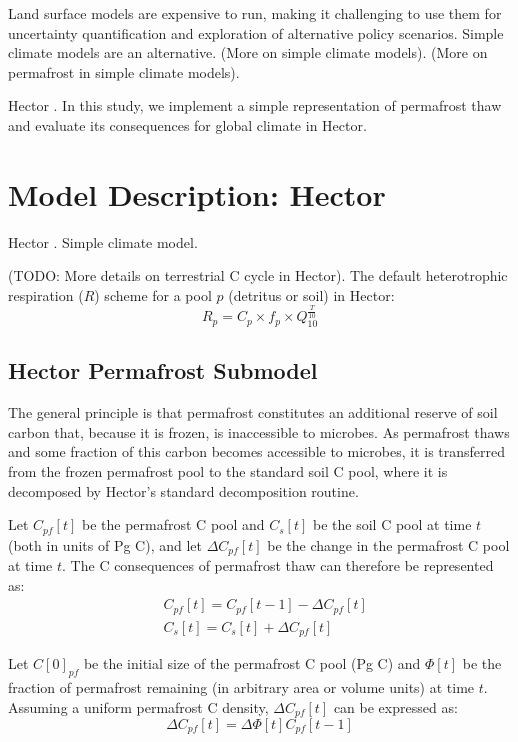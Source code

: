 \documentclass[essd, manuscript]{copernicus}
\begin{document}
Land surface models are expensive to run, making it challenging to use them for uncertainty quantification and exploration of alternative policy scenarios.
Simple climate models are an alternative.
(More on simple climate models).
(More on permafrost in simple climate models).

Hector \citep{hartin_2015_simple, vega-westhoff_2019_impacts}.
In this study, we implement a simple representation of permafrost thaw and evaluate its consequences for global climate in Hector.


\section{Model Description: Hector}
Hector \citep{hartin_2015_simple, hartin_2016_ocean}.
Simple climate model.

(TODO: More details on terrestrial C cycle in Hector).
The default heterotrophic respiration ($R$) scheme for a pool $p$ (detritus or soil) in Hector: 
\begin{equation}
R_{p} = C_p \times f_p \times Q_{10} ^ \frac{T}{10}    
\end{equation} 


\subsection{Hector Permafrost Submodel}
The general principle is that permafrost constitutes an additional reserve of soil carbon that, because it is frozen, is inaccessible to microbes. As permafrost thaws and some fraction of this carbon becomes accessible to microbes, it is transferred from the frozen permafrost pool to the standard soil C pool, where it is decomposed by Hector's standard decomposition routine.

Let $C_{pf}[t]$ be the permafrost C pool and $C_{s}[t]$ be the soil C pool at time $t$ (both in units of Pg C), and let $\Delta C_{pf}[t]$ be the change in the permafrost C pool at time $t$.
The C consequences of permafrost thaw can therefore be represented as: \begin{align}
&C_{pf}[t] = C_{pf}[t-1] - \Delta C_{pf}[t]\\
&C_{s}[t] = C_{s}[t] + \Delta C_{pf}[t]
\end{align}

Let $C[0]_{pf}$ be the initial size of the permafrost C pool (Pg C) and $\Phi[t]$ be the fraction of permafrost remaining (in arbitrary area or volume units) at time $t$.
Assuming a uniform permafrost C density, $\Delta C_{pf}[t]$ can be expressed as: 
\begin{equation} 
\Delta C_{pf}[t] = \Delta \Phi[t] C_{pf}[t-1]
\end{equation}
\end{document}
